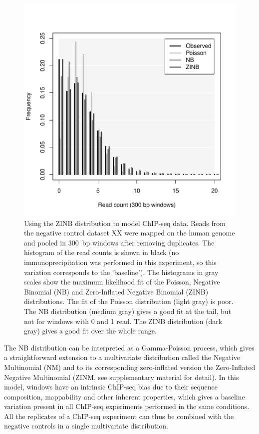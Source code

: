 \documentclass{bioinfo}
\begin{document}
\begin{methods}
\begin{figure}[!tpb]
\centerline{\includegraphics[scale=0.55]{ZINB_fit.pdf}}
\caption{Using the ZINB distribution to model ChIP-seq data. Reads from
the negative control dataset XX were mapped on the human genome and pooled
in 300~bp windows after removing duplicates. The histogram of the read
counts is shown in black (no immunoprecipitation was performed in this
experiment, so this variation corresponds to the `baseline'). The
histograms in gray scales show the maximum likelihood fit of the Poisson,
Negative Binomial (NB) and Zero-Inflated Negative Binomial (ZINB)
distributions. The fit of the Poisson distribution (light gray) is poor.
The NB distribution (medium gray) gives a good fit at the tail, but not
for windows with 0 and 1 read. The ZINB distribution (dark gray) gives
a good fit over the whole range.
}\label{fig:ZINB_fit}
\end{figure}

The NB distribution can be interpreted as a Gamma-Poisson process,
which gives a straightforward extension to a multivariate
distribution called the Negative Multinomial (NM) and to its
corresponding zero-inflated version the Zero-Inflated Negative
Multinomial (ZINM, see supplementary material for detail). In this model,
windows have an intrinsic ChIP-seq bias due to their sequence composition,
mappability and other inherent properties, which gives a baseline
variation present in all ChIP-seq experiments performed in the same
conditions. All the replicates of a ChIP-seq experiment can thus be
combined with the negative controls in a single multivariate
distribution.


\end{methods}
\end{document}
